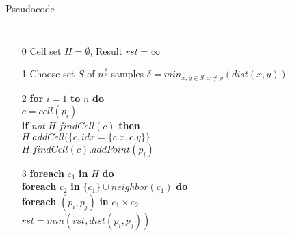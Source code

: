 \documentclass[18pt]{beamer}
\begin{document}
\begin{frame}{Pseudocode}
\begin{columns}
\begin{itemize}\itemsep0pt
\item[\footnotesize 0] Cell set $H = \emptyset$, Result $rst = \infty$\\
						
\vspace{8pt}
\item[\footnotesize 1] Choose set $S$ of $n^{\frac{2}{3}}$ samples
						$\delta = min_{x,y \in S, x \neq y}(dist(x, y))$
\item[\footnotesize 2] \textbf{for} $i = 1$ \textbf{to} $n$ \textbf{do} \\
						\hspace{2em}$c = cell(p_i)$ \\
						\hspace{2em}\textbf{if} \textit{not} $H.findCell(c)$ \textbf{then} \\
						\hspace{4em}$H.addCell(\{c, idx = \{c.x, c.y\}\}$ \\
						\hspace{2em}$H.findCell(c).addPoint(p_i)$ \\
\item[\footnotesize 3] %
						\textbf{foreach} $c_1$ \textbf{in} $H$ \textbf{do} \\
						\hspace{2em} \textbf{foreach} $c_2$ \textbf{in} $\{c_1\} \cup neighbor(c_1)$ \textbf{do} \\
						\hspace{4em} \textbf{foreach} $(p_i,p_j)$ \textbf{in} $c_1 \times c_2$ \\
						\hspace{6em} $rst = min(rst, dist(p_i, p_j))$
\end{itemize}


\end{columns}
\end{frame}
\end{document}
